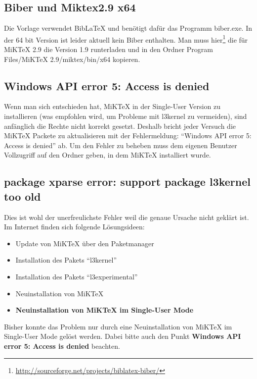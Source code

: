 \subsection{Biber und Miktex2.9 x64}
Die Vorlage verwendet BibLaTeX und benötigt dafür das Programm biber.exe.
In der 64 bit Version ist leider aktuell kein Biber enthalten.
Man muss hier\footnote{\url{http://sourceforge.net/projects/biblatex-biber/}}  die für MiKTeX 2.9 die Version 1.9 runterladen und in den Ordner Program Files/MiKTeX 2.9/miktex/bin/x64 kopieren.

\subsection{Windows API error 5: Access is denied}
Wenn man sich entschieden hat, MiKTeX in der Single-User Version zu installieren (was empfohlen wird, um Probleme mit l3kernel zu vermeiden), sind anfänglich die Rechte nicht korrekt gesetzt. 
Deshalb bricht jeder Versuch die MiKTeX Packete zu aktualisieren mit der Fehlermeldung: "`Windows API error 5: Access is denied"' ab.
Um den Fehler zu beheben muss dem eigenen Benutzer Vollzugriff auf den Ordner geben, in dem MiKTeX installiert wurde.

\subsection{package xparse error: support package l3kernel too old}
Dies ist wohl der unerfreulichste Fehler weil die genaue Ursache nicht geklärt ist.
Im Internet finden sich folgende Lösungsideen:
\begin{itemize}
	\item Update von MiKTeX über den Paketmanager
	\item Installation des Pakets "`l3kernel"'
	\item Installation des Pakets "`l3experimental"'
	\item Neuinstallation von MiKTeX
	\item \textbf{Neuinstallation von MiKTeX im Single-User Mode}
\end{itemize}
Bisher konnte das Problem nur durch eine Neuinstallation von MiKTeX im Single-User Mode gelöst werden. Dabei bitte auch den Punkt \textbf{Windows API error 5: Access is denied} beachten.

